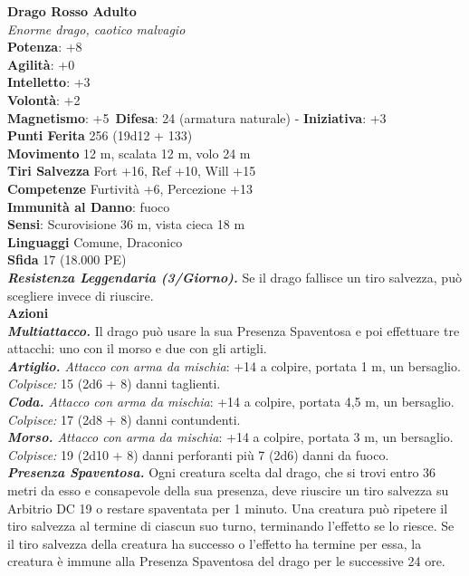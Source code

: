 \begin{multicols}{2}
\medskip\textbf{Drago Rosso Adulto}\\
\emph{Enorme drago, caotico malvagio}\\
\textbf{Potenza}: +8\\
\textbf{Agilità}: +0\\
\textbf{Intelletto}: +3\\
\textbf{Volontà}: +2\\
\textbf{Magnetismo}: +5\
\textbf{Difesa}: 24 (armatura naturale) - \textbf{Iniziativa}: +3\\
\textbf{Punti Ferita} 256 (19d12 + 133)\\
\textbf{Movimento} 12 m, scalata 12 m, volo 24 m\\
\textbf{Tiri Salvezza} Fort +16, Ref +10, Will +15\\
\textbf{Competenze} Furtività +6, Percezione +13\\
\textbf{Immunità al Danno}: fuoco\\
\textbf{Sensi}: Scurovisione 36 m, vista cieca 18 m\\
\textbf{Linguaggi} Comune, Draconico\\
\textbf{Sfida} 17 (18.000 PE)\smallskip\\
\emph{\textbf{Resistenza Leggendaria (3/Giorno).}} Se il drago fallisce un tiro salvezza, può scegliere invece di riuscire.\\
\smallskip\textbf{Azioni}\\
\emph{\textbf{Multiattacco.}} Il drago può usare la sua Presenza Spaventosa e poi effettuare tre attacchi: uno con il morso e due con gli artigli.\\
\emph{\textbf{Artiglio.} Attacco con arma da mischia}: +14 a colpire, portata 1 m, un bersaglio.\\
\emph{Colpisce:} 15 (2d6 + 8) danni taglienti.\\
\emph{\textbf{Coda.} Attacco con arma da mischia}: +14 a colpire, portata 4,5 m, un bersaglio.\\
\emph{Colpisce:} 17 (2d8 + 8) danni contundenti.\\
\emph{\textbf{Morso.} Attacco con arma da mischia}: +14 a colpire, portata 3 m, un bersaglio.\\
\emph{Colpisce:} 19 (2d10 + 8) danni perforanti più 7 (2d6) danni da fuoco.\\
\emph{\textbf{Presenza Spaventosa.}} Ogni creatura scelta dal drago, che si trovi entro 36 metri da esso e consapevole della sua presenza, deve riuscire un tiro salvezza su Arbitrio DC 19 o restare spaventata per 1 minuto. Una creatura può ripetere il tiro salvezza al termine di ciascun suo turno, terminando l'effetto se lo riesce. Se il tiro salvezza della creatura ha successo o l'effetto ha termine per essa, la creatura è immune alla Presenza Spaventosa del drago per le successive 24 ore.\\

\end{multicols}
